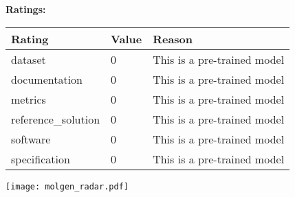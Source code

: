 {{{\bf Ratings:} ~ \\

\begin{tabular}{p{} p{} p{}}
\hline
Rating & Value & Reason \\
\hline
dataset & 0 & This is a pre-trained model
 \\
documentation & 0 & This is a pre-trained model
 \\
metrics & 0 & This is a pre-trained model
 \\
reference\_solution & 0 & This is a pre-trained model
 \\
software & 0 & This is a pre-trained model
 \\
specification & 0 & This is a pre-trained model
 \\
\hline
\end{tabular}

\texttt{[image: molgen\_radar.pdf]}
}}
\clearpage